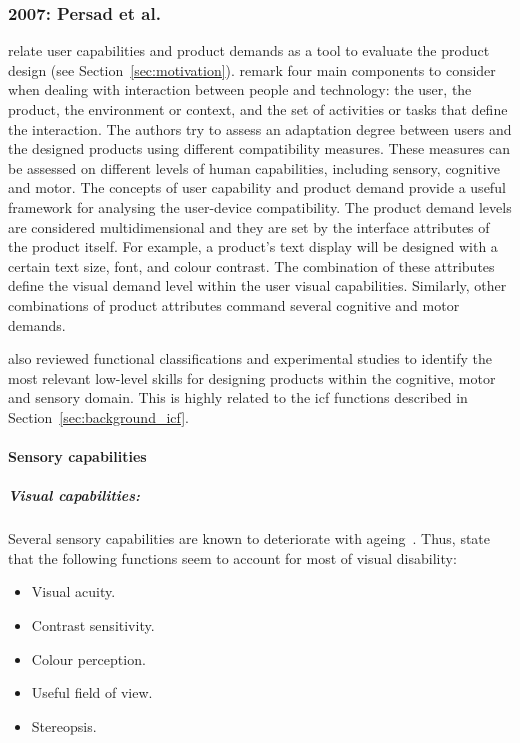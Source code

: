 
\subsubsection{2007: Persad et al.}
\label{sec:persad}

\citet{persad_cognitive_2007}\citep{persad_characterising_2007} relate user
capabilities and product demands as a tool to evaluate the product design (see Section~\ref{sec:motivation}).
\citeauthor{persad_characterising_2007} remark four main components to consider 
when dealing with interaction between people and technology: the user, the 
product, the environment or context, and the set of activities or tasks 
that define the interaction. The authors try to assess an adaptation degree 
between users and the designed products using different compatibility measures. 
These measures can be assessed on different levels of human capabilities, 
including sensory, cognitive and motor. The concepts of user capability and 
product demand provide a useful framework for analysing the user-device 
compatibility. The product demand levels are considered multidimensional and 
they are set by the interface attributes of the product itself. For example, 
a product's text display will be designed with a certain text size, font, and 
colour contrast. The combination of these attributes define the visual demand 
level within the user visual capabilities. Similarly, other combinations of 
product attributes command several cognitive and motor demands. 

\citeauthor{persad_cognitive_2007} also reviewed functional classifications 
and experimental studies to identify the most relevant low-level skills for 
designing products within the cognitive, motor and sensory domain. This is 
highly related to the \ac{icf} functions described in Section~\ref{sec:background_icf}.

\paragraph*{Sensory capabilities}
\subparagraph*{Visual capabilities:} Several sensory capabilities are known to 
deteriorate with ageing~\citep{persad_exploring_2006}. Thus, 
\citeauthor{persad_exploring_2006} state that the following functions seem to 
account for most of visual disability:

\begin{itemize}
  \item Visual acuity.
  \item Contrast sensitivity.
  \item Colour perception.
  \item Useful field of view.
  \item Stereopsis.
\end{itemize}


